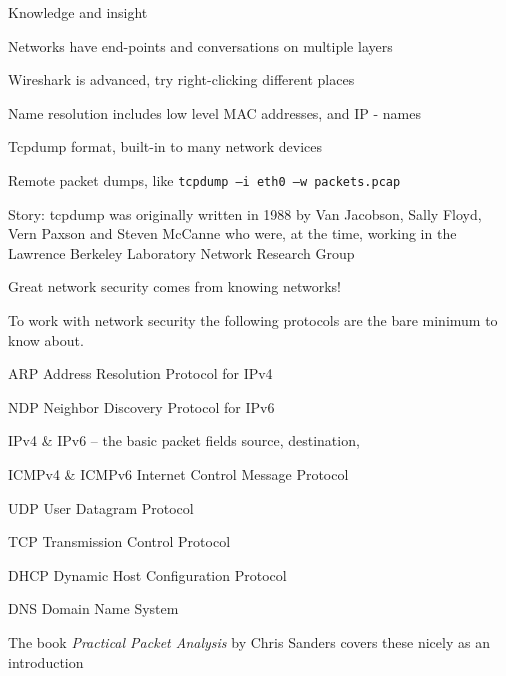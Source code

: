 \documentclass[Screen16to9,17pt]{foils}
\begin{document}

{\Large Knowledge and insight}
\begin{list2}
\item Networks have end-points and conversations on multiple layers
\item Wireshark is advanced, try right-clicking different places
\item Name resolution includes low level MAC addresses, and IP - names
\end{list2}

\begin{list2}
\item Tcpdump format, built-in to many network devices
\item Remote packet dumps, like \verb+tcpdump –i eth0 –w packets.pcap+
\item Story: tcpdump was originally written in 1988 by Van Jacobson, Sally Floyd, Vern Paxson and Steven McCanne who were, at the time, working in the Lawrence Berkeley Laboratory Network Research Group\\
\end{list2}

\vskip 5mm

\centerline{\Large Great network security comes from knowing networks!}




To work with network security the following protocols are the bare minimum to know about.

\begin{list2}
\item ARP Address Resolution Protocol for IPv4
\item NDP Neighbor Discovery Protocol for IPv6
\item IPv4 \& IPv6 -- the basic packet fields source, destination,
\item ICMPv4 \& ICMPv6 Internet Control Message Protocol
\item UDP User Datagram Protocol
\item TCP Transmission Control Protocol
\item DHCP Dynamic Host Configuration Protocol
\item DNS Domain Name System
\end{list2}

The book \emph{Practical Packet Analysis} by Chris Sanders covers these nicely as an introduction
\end{document}

